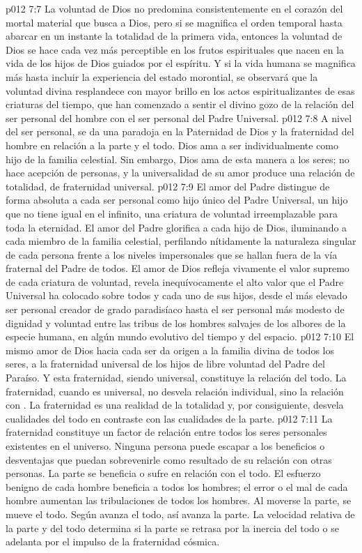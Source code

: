 \vs p012 7:7 \pc La voluntad de Dios no predomina consistentemente en el corazón del mortal material que busca a Dios, pero si se magnifica el orden temporal hasta abarcar en un instante la totalidad de la primera vida, entonces la voluntad de Dios se hace cada vez más perceptible en los frutos espirituales que nacen en la vida de los hijos de Dios guiados por el espíritu. Y si la vida humana se magnifica más hasta incluir la experiencia del estado morontial, se observará que la voluntad divina resplandece con mayor brillo en los actos espiritualizantes de esas criaturas del tiempo, que han comenzado a sentir el divino gozo de la relación del ser personal del hombre con el ser personal del Padre Universal.
\vs p012 7:8 A nivel del ser personal, se da una paradoja en la Paternidad de Dios y la fraternidad del hombre en relación a la parte y el todo. Dios ama a  ser individualmente como hijo de la familia celestial. Sin embargo, Dios ama de esta manera a  los seres; no hace acepción de personas, y la universalidad de su amor produce una relación de totalidad, de fraternidad universal.
\vs p012 7:9 El amor del Padre distingue de forma absoluta a cada ser personal como hijo único del Padre Universal, un hijo que no tiene igual en el infinito, una criatura de voluntad irreemplazable para toda la eternidad. El amor del Padre glorifica a cada hijo de Dios, iluminando a cada miembro de la familia celestial, perfilando nítidamente la naturaleza singular de cada persona frente a los niveles impersonales que se hallan fuera de la vía fraternal del Padre de todos. El amor de Dios refleja vivamente el valor supremo de cada criatura de voluntad, revela inequívocamente el alto valor que el Padre Universal ha colocado sobre todos y cada uno de sus hijos, desde el más elevado ser personal creador de grado paradisíaco hasta el ser personal más modesto de dignidad y voluntad entre las tribus de los hombres salvajes de los albores de la especie humana, en algún mundo evolutivo del tiempo y del espacio.
\vs p012 7:10 El mismo amor de Dios hacia cada ser da origen a la familia divina de todos los seres, a la fraternidad universal de los hijos de libre voluntad del Padre del Paraíso. Y esta fraternidad, siendo universal, constituye la relación del todo. La fraternidad, cuando es universal, no desvela  relación individual, sino la relación con . La fraternidad es una realidad de la totalidad y, por consiguiente, desvela cualidades del todo en contraste con las cualidades de la parte.
\vs p012 7:11 La fraternidad constituye un factor de relación entre todos los seres personales existentes en el universo. Ninguna persona puede escapar a los beneficios o desventajas que puedan sobrevenirle como resultado de su relación con otras personas. La parte se beneficia o sufre en relación con el todo. El esfuerzo benigno de cada hombre beneficia a todos los hombres; el error o el mal de cada hombre aumentan las tribulaciones de todos los hombres. Al moverse la parte, se mueve el todo. Según avanza el todo, así avanza la parte. La velocidad relativa de la parte y del todo determina si la parte se retrasa por la inercia del todo o se adelanta por el impulso de la fraternidad cósmica.
